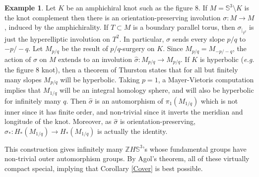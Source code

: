 \documentclass[11pt]{amsart}
\numberwithin{thm}{section}
\theoremstyle{remark}
\theoremstyle{definition}
\newtheorem{example}[thm]{Example}
\newcommand{\Z}{\mathbb{Z}}
\newcommand{\Sa}{\mathbb{S}}
\newcommand{\what}{\widehat}
\begin{document}
\begin{example} Let $K$ be an amphichiral knot such as the figure 8. If $M=\Sa^3\setminus K$ is the knot complement then there is an orientation-preserving involution $\sigma:M\rightarrow M$, induced by the amphichirality.  If $T\subset M$ is a boundary parallel torus, then $\sigma_{|_{T^2}}$ is just the hyperelliptic involution on $T^2$.  In particular, $\sigma$ sends every slope $p/q$ to $-p/-q$.  Let $M_{p/q}$ be the result of $p/q$-surgery on $K$. Since $M_{p/q}=M_{-p/-q}$, the action of $\sigma$ on $M$ extends to an involution $\what{\sigma}:M_{p/q}\rightarrow M_{p/q}$.  If $K$ is hyperbolic (\emph{e.g.} the figure 8 knot), then a theorem of Thurston states that for all but finitely many slopes $M_{p/q}$ will be hyperbolic.  Taking $p=1$, a Mayer-Vietoris computation implies that $M_{1/q}$ will be an integral homology sphere, and will also be hyperbolic for infinitely many $q$.  Then $\what{\sigma}$ is an automorphism of $\pi_1(M_{1/q})$ which is not inner since it has finite order, and non-trivial since it inverts the meridian and longitude of the knot.  Moreover, as $\what{\sigma}$ is orientation-preserving, $\what{\sigma}_*:H_*(M_{1/q})\rightarrow H_*(M_{1/q})$ is actually the identity.  

This construction gives infinitely many $\Z H\Sa^3$'s whose fundamental groups have non-trivial outer automorphism groups.  By Agol's theorem, all of these virtually compact special, implying that Corollary \ref{Cover} is best possible.
\end{example}
\end{document}
